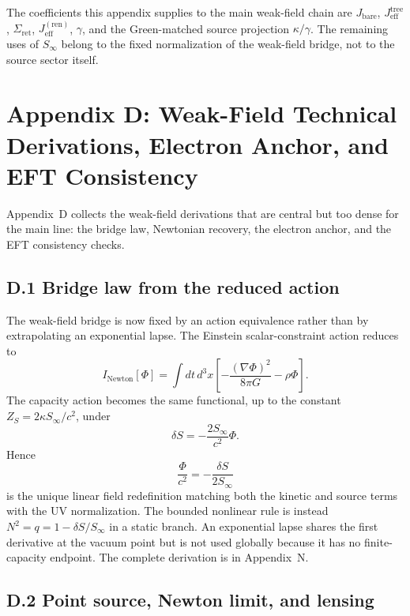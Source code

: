 \documentclass[11pt]{article}
\begin{document}
The coefficients this appendix supplies to the main weak-field chain are $J_{\mathrm{bare}}$, $J_{\mathrm{eff}}^{\mathrm{tree}}$, $\Sigma_{\mathrm{ret}}$, $J_{\mathrm{eff}}^{(\mathrm{ren})}$, $\gamma$, and the Green-matched source projection $\kappa/\gamma$. The remaining uses of $S_\infty$ belong to the fixed normalization of the weak-field bridge, not to the source sector itself.

\section*{Appendix D: Weak-Field Technical Derivations, Electron Anchor, and EFT Consistency}

Appendix~D collects the weak-field derivations that are central but too dense for the main line: the bridge law, Newtonian recovery, the electron anchor, and the EFT consistency checks.

\subsection*{D.1 Bridge law from the reduced action}

The weak-field bridge is now fixed by an action equivalence rather than by extrapolating an exponential lapse. The Einstein scalar-constraint action reduces to
\[
I_{\mathrm{Newton}}[\Phi]
=\int dt\,d^3x
\left[-\frac{(\nabla\Phi)^2}{8\pi G}-\rho\Phi\right].
\]
The capacity action becomes the same functional, up to the constant $Z_S=2\kappa S_\infty/c^2$, under
\[
\delta S=-\frac{2S_\infty}{c^2}\Phi.
\]
Hence
\[
\frac{\Phi}{c^2}=-\frac{\delta S}{2S_\infty}
\]
is the unique linear field redefinition matching both the kinetic and source terms with the UV normalization. The bounded nonlinear rule is instead $N^2=q=1-\delta S/S_\infty$ in a static branch. An exponential lapse shares the first derivative at the vacuum point but is not used globally because it has no finite-capacity endpoint. The complete derivation is in Appendix~N.

\subsection*{D.2 Point source, Newton limit, and lensing}
\end{document}
